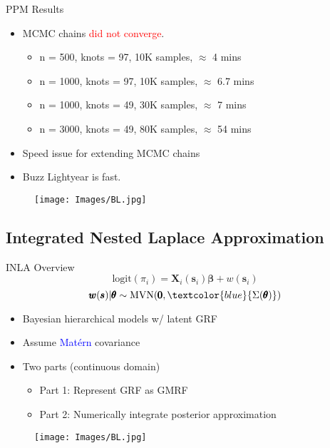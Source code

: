 \documentclass{beamer}
\begin{document}
\begin{frame}{PPM Results}

\begin{itemize}
\addtolength{\itemsep}{0.5\baselineskip}
\item MCMC chains \textcolor{red}{did not converge}. \\
      \begin{itemize}
      \addtolength{\itemsep}{0.5\baselineskip}
      \item n = 500, knots = 97, 10K samples, $\approx$ 4 mins
      \item n = 1000, knots = 97, 10K samples, $\approx$ 6.7 mins
      \item n = 1000, knots = 49, 30K samples, $\approx$ 7 mins
      \item n = 3000, knots = 49, 80K samples, $\approx$ 54 mins
      \end{itemize}
\item Speed issue for extending MCMC chains
\item Buzz Lightyear is fast.
\end{itemize}
  \begin{figure}[H]
	\centering
	\texttt{[image: Images/BL.jpg]}
	\end{figure}
\end{frame}

\subsection{Integrated Nested Laplace Approximation}

\begin{frame}{INLA Overview}
$$ \text{logit}(\pi_{i}) = \pmb{X}_{i}(\pmb{s}_{i})\pmb{\beta} + w(\pmb{s}_{i}) $$
$$\pmb{w}(\pmb{s}) | \pmb{\theta} \sim \text{MVN}(\pmb{0}, \textcolor{blue}{\Sigma(\pmb{\theta})})$$
\begin{itemize}
\addtolength{\itemsep}{0.5\baselineskip}
\item Bayesian hierarchical models w/ latent GRF
\item Assume \textcolor{blue}{Mat\'ern} covariance
\item Two parts (continuous domain) \\
  \begin{itemize}
  \addtolength{\itemsep}{0.5\baselineskip}
  \item Part 1: Represent GRF as GMRF 
  \item Part 2: Numerically integrate posterior approximation
  \end{itemize}
\end{itemize}
  \begin{figure}[H]
	\centering
	\texttt{[image: Images/BL.jpg]}
	\end{figure}
\end{frame}
\end{document}
